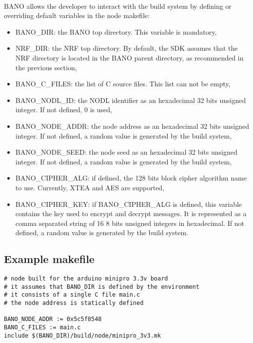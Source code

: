 \documentclass[a4paper, 11pt]{article}
\begin{document}
\paragraph{}
BANO allows the developer to interact with the build system by
defining or overriding default variables in the node makefile:
\begin{itemize}
\item BANO\_DIR: the BANO top directory. This variable is
mandatory,
\item NRF\_DIR: the NRF top directory. By default, the SDK
assumes that the NRF directory is located in the BANO parent
directory, as recommended in the previous section,
\item BANO\_C\_FILES: the list of C source files. This list
can not be empty,
\item BANO\_NODL\_ID: the NODL identifier as an hexadecimal
32 bits unsigned integer. If not defined, 0 is used,
\item BANO\_NODE\_ADDR: the node address as an hexadecimal 32
bits unsigned integer. If not defined, a random value is
generated by the build system,
\item BANO\_NODE\_SEED: the node seed as an hexadecimal 32
bits unsigned integer. If not defined, a random value is
generated by the build system,
\item BANO\_CIPHER\_ALG: if defined, the 128 bits block cipher
algorithm name to use. Currently, XTEA and AES are supported,
\item BANO\_CIPHER\_KEY: if BANO\_CIPHER\_ALG is defined, this
variable contains the key used to encrypt and decrypt messages.
It is represented as a comma separated string of 16 8 bits
unsigned integers in hexadecimal. If not defined, a random value
is generated by the build system.
\end{itemize}

\subsection{Example makefile}
\begin{scriptsize}
\begin{verbatim}
# node built for the arduino minipro 3.3v board
# it assumes that BANO_DIR is defined by the environment
# it consists of a single C file main.c
# the node address is statically defined

BANO_NODE_ADDR := 0x5c5f8548
BANO_C_FILES := main.c
include $(BANO_DIR)/build/node/minipro_3v3.mk
\end{verbatim}
\end{scriptsize}
\end{document}
